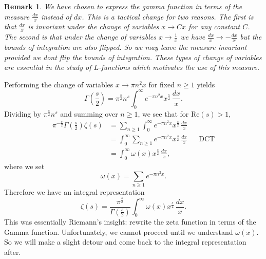 \documentclass[12pt]{book}
\newtheorem{remark}{Remark}[section]
\theoremstyle{definition}\newframedtheorem{method}{Method}
\newcommand{\z}{\zeta}
\newcommand{\w}{\omega}
\newcommand{\G}{\Gamma}
\newcommand{\<}{\langle}
\renewcommand{\>}{\rangle}
\renewcommand{\Re}{\mathrm{Re}}
\begin{document}
      \begin{remark}
        We have chosen to express the gamma function in terms of the measure $\frac{dx}{x}$ instead of $dx$. This is a tactical change for two reasons. The first is that $\frac{dx}{x}$ is invariant under the change of variables $x \to Cx$ for any constant $C$. The second is that under the change of variables $x \to \frac{1}{x}$ we have $\frac{dx}{x} \to -\frac{dx}{x}$ but the bounds of integration are also flipped. So we may leave the measure invariant provided we dont flip the bounds of integration. These types of change of variables are essential in the study of $L$-functions which motivates the use of this measure.
      \end{remark}

      Performing the change of variables $x \to \pi n^{2}x$ for fixed $n \ge 1$ yields
      \begin{equation}\label{equ:gamma_integral_substitution}
        \G\left(\frac{s}{2}\right) = \pi^{\frac{s}{2}} n^{s}\int_{0}^{\infty}e^{-\pi n^{2}x}x^{\frac{s}{2}}\,\frac{dx}{x}.
      \end{equation}
      Dividing by $\pi^{\frac{s}{2}}n^{s}$ and summing over $n \ge 1$, we see that for $\Re(s) > 1$,
      \begin{align*}
        \pi^{-\frac{s}{2}}\G\left(\frac{s}{2}\right)\z(s) &= \sum_{n \ge 1}\int_{0}^{\infty}e^{-\pi n^{2}x}x^{\frac{s}{2}}\,\frac{dx}{x} \\
        &= \int_{0}^{\infty}\sum_{n \ge 1}e^{-\pi n^{2}x}x^{\frac{s}{2}}\,\frac{dx}{x} && \text{DCT} \\
        &= \int_{0}^{\infty}\w(x)x^{\frac{s}{2}}\,\frac{dx}{x},
      \end{align*}
      where we set
      \[
        \w(x) = \sum_{n \ge 1}e^{-\pi n^{2}x}.
      \]
      Therefore we have an integral representation
      \begin{equation}\label{equ:integral_representation_zeta_1}
        \z(s) = \frac{\pi^{\frac{s}{2}}}{\G\left(\frac{s}{2}\right)}\int_{0}^{\infty}\w(x)x^{\frac{s}{2}}\,\frac{dx}{x}.
      \end{equation}
      This was essentially Riemann's insight: rewrite the zeta function in terms of the Gamma function. Unfortunately, we cannot proceed until we understand $\w(x)$. So we will make a slight detour and come back to the integral representation after.
\end{document}
